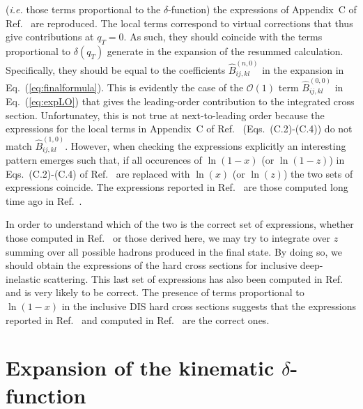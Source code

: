 \documentclass[10pt,a4paper]{article}
\begin{document}
(\textit{i.e.} those terms proportional to the $\delta$-function) the
expressions of Appendix~C of Ref.~\cite{deFlorian:1997zj} are
reproduced. The local terms correspond to virtual corrections that
thus give contributions at $q_T=0$. As such, they should coincide with
the terms proportional to $\delta(q_T)$ generate in the expansion of
the resummed calculation. Specifically, they should be equal to the
coefficients $\hat{B}_{ij,kl}^{(n,0)}$ in the expansion in
Eq.~(\ref{eq:finalformula}). This is evidently the case of the
$\mathcal{O}(1)$ term $\hat{B}_{ij,kl}^{(0,0)}$ in
Eq.~(\ref{eq:expLO}) that gives the leading-order contribution to the
integrated cross section. Unfortunatey, this is not true at
next-to-leading order because the expressions for the local terms in
Appendix~C of Ref.~\cite{deFlorian:1997zj} (Eqs.~(C.2)-(C.4)) do not
match $\hat{B}_{ij,kl}^{(1,0)}$. However, when checking the
expressions explicitly an interesting pattern emerges such that, if
all occurences of $\ln(1-x)$ (or $\ln(1-z)$) in Eqs.~(C.2)-(C.4) of
Ref.~\cite{deFlorian:1997zj} are replaced with $\ln(x)$ (or $\ln(z)$)
the two sets of expressions coincide. The expressions reported in
Ref.~\cite{deFlorian:1997zj} are those computed long time ago in
Ref.~\cite{Furmanski:1981cw}.

In order to understand which of the two is the correct set of
expressions, whether those computed in Ref.~\cite{Furmanski:1981cw} or
those derived here, we may try to integrate over $z$ summing over all
possible hadrons produced in the final state. By doing so, we should
obtain the expressions of the hard cross sections for inclusive
deep-inelastic scattering. This last set of expressions has also been
computed in Ref.~\cite{Furmanski:1981cw} and is very likely to be
correct. The presence of terms proportional to $\ln(1-x)$ in the
inclusive DIS hard cross sections suggests that the expressions
reported in Ref.~\cite{deFlorian:1997zj} and computed in
Ref.~\cite{Furmanski:1981cw} are the correct ones.

\appendix

\section{Expansion of the kinematic $\delta$-function}\label{sec:deltaexpansion}
\end{document}

